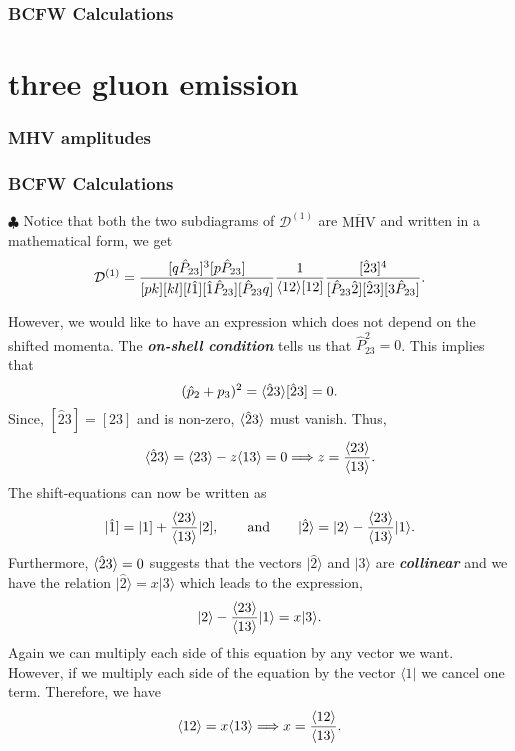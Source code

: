 \subsubsection{BCFW Calculations}
\label{BCFW12}


\section{three gluon emission}

\subsubsection{MHV amplitudes}
\label{MHVcalc3}

\subsubsection{BCFW Calculations}
\label{BCFW13}

$\clubsuit$ Notice that both the two subdiagrams of $\mathcal{D}^{(1)}$ are $\overline{\text{MHV}}$ and written in a mathematical form, we get
\begin{equation}
\mathcal{D}^{(1)}=\frac{[q\hat{P}_{23}]^3[p\hat{P}_{23}]}{[pk] [kl] [l\hat{1}] [\hat{1} \hat{P}_{23}] [\hat{P}_{23} q]} \frac{1}{\langle12\rangle[12]} \frac{[\hat{2}3]^4}{[\hat{P}_{23} \hat{2}] [\hat{2}3] [3\hat{P}_{23}]}. 
\end{equation}

However, we would like to have an expression which does not depend on the shifted momenta. The \textbf{\emph{on-shell condition}} tells us that $\widehat{P}_{23}^2=0$. This implies that
\begin{equation}
(\hat{p}_2+p_3)^2= \langle\hat{2}3\rangle [\hat{2}3]=0.
\end{equation}
Since, $[\hat{2}3]=[23]$ and is non-zero, $\langle\hat{2}3\rangle$ must vanish. Thus,
\begin{equation}
\langle\hat{2}3\rangle=\langle23\rangle-z\langle13\rangle=0 \Longrightarrow z=\frac{\langle23\rangle}{\langle13\rangle}.
\end{equation}
The shift-equations can now be written as
\begin{equation}
\vert \hat{1} ] =\vert 1] + \frac{\langle23\rangle}{\langle13\rangle} \vert 2], \qquad \text{and} \qquad \vert \hat{2} \rangle = \vert 2 \rangle - \frac{\langle23\rangle}{\langle13\rangle} \vert 1\rangle .
\end{equation}
Furthermore, $\langle\hat{2}3\rangle=0$ suggests that the vectors $\vert \hat{2} \rangle$ and $\vert 3\rangle$ are \textbf{\emph{collinear}} and we have the relation $\vert \hat{2} \rangle = x \vert 3\rangle$ which leads to the expression,
\begin{equation}
\vert 2\rangle -\frac{\langle23\rangle}{\langle13\rangle} \vert 1 \rangle=x \vert 3\rangle .
\end{equation}
Again we can multiply each side of this equation by any vector we want. However, if we multiply each side of the equation by the vector $\langle 1\vert$ we cancel one term. Therefore, we have
\begin{equation}
\langle12\rangle=x \langle13\rangle \Longrightarrow x=\frac{\langle12\rangle}{\langle13\rangle}.
\end{equation}

